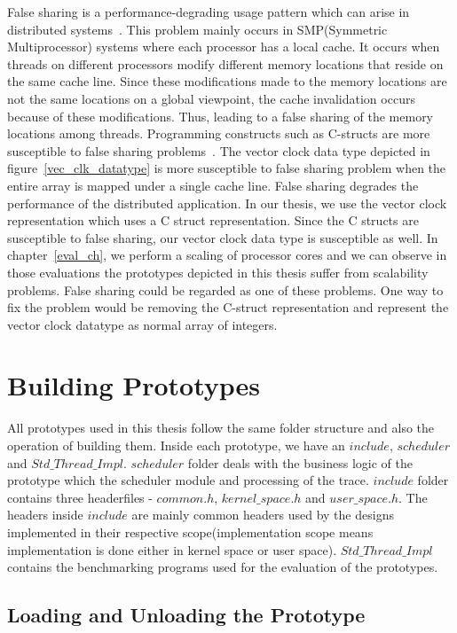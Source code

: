 False sharing is a performance-degrading usage pattern which can arise in distributed systems~\citep{torrellas1994false}. 
This problem mainly occurs in SMP(Symmetric Multiprocessor) systems where each processor has a local cache. 
It occurs when threads on different processors modify different memory locations that reside on the same cache line. 
Since these modifications made to the memory locations are not the same locations on a global viewpoint, the cache invalidation occurs because of these modifications. 
Thus, leading to a false sharing of the memory locations among threads. 
Programming constructs such as C-structs are more susceptible to false sharing problems~\citep{torrellas1994false}. 
The vector clock data type depicted in figure~\ref{vec_clk_datatype} is more susceptible to false sharing problem when the entire array is mapped under a single cache line. 
False sharing degrades the performance of the distributed application. 
In our thesis, we use the vector clock representation which uses a C struct representation. 
Since the C structs are susceptible to false sharing, our vector clock data type is susceptible as well. 
In chapter~\ref{eval_ch}, we perform a scaling of processor cores and we can observe in those evaluations the prototypes depicted in this thesis suffer from scalability problems. 
False sharing could be regarded as one of these problems. 
One way to fix the problem would be removing the C-struct representation and represent the vector clock datatype as normal array of integers.
 
\section{Building Prototypes}

All prototypes used in this thesis follow the same folder structure and also the operation of building them. 
Inside each prototype, we have an $include$, $scheduler$ and $Std\_Thread\_Impl$. 
$scheduler$ folder deals with the business logic of the prototype which the scheduler module and processing of the trace. 
$include$ folder contains three headerfiles - $common.h$, $kernel\_space.h$ and $user\_space.h$. 
The headers inside $include$ are mainly common headers used by the designs implemented in their respective scope(implementation scope means implementation is done either in kernel space or user space). 
$Std\_Thread\_Impl$ contains the benchmarking programs used for the evaluation of the prototypes. 

\subsection*{Loading and Unloading the Prototype}

